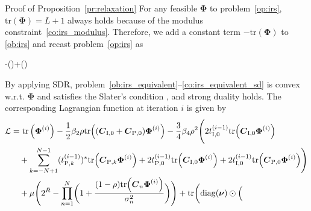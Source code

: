 \documentclass[journal,12pt,onecolumn,draftclsnofoot]{IEEEtran}
\begin{document}
	\begin{appendix}
		\begin{subsection}{Proof of Proposition~\ref{pr:relaxation}}\label{ap:relaxation}
			For any feasible $\boldsymbol{\Phi}$ to problem~\eqref{op:irs}, $\mathrm{tr}(\boldsymbol{\Phi})=L+1$ always holds because of the modulus constraint~\eqref{co:irs_modulus}. Therefore, we add a constant term $-\mathrm{tr}(\boldsymbol{\Phi})$ to \eqref{ob:irs} and recast problem~\eqref{op:irs} as
			\begin{maxi!}
				{\scriptstyle{\boldsymbol{\Phi}}}{-(\boldsymbol{\Phi})+(\boldsymbol{\Phi})}{\label{op:irs_equivalent}}{\label{ob:irs_equivalent}}
				\label{co:irs_equivalent_rate}
				\label{co:irs_equivalent_modulus}
				\label{co:irs_equivalent_sd}
			\end{maxi!}
			By applying SDR, problem~\eqref{ob:irs_equivalent}--\eqref{co:irs_equivalent_sd} is convex w.r.t. $\boldsymbol{\Phi}$ and satisfies the Slater's condition \cite{Boyd2004}, and strong duality holds. The corresponding Lagrangian function at iteration $i$ is given by
			\begin{align}\label{eq:lagrangian}
				\mathcal{L}
				& = \mathrm{tr}\left(\boldsymbol{\Phi}^{(i)}\right) - \frac{1}{2} \beta_2 \rho \mathrm{tr}\Bigl(
						(\boldsymbol{C}_{\mathrm{I},0} + \boldsymbol{C}_{\mathrm{P},0}) \boldsymbol{\Phi}^{(i)}
					\Bigr) - \frac{3}{4} \beta_4 \rho^2 \Biggl(
						2 t_{\mathrm{I},0}^{(i-1)} \mathrm{tr}\Bigl(
							\boldsymbol{C}_{\mathrm{I},0} \boldsymbol{\Phi}^{(i)}
						\Bigr)\nonumber\\
				& \quad + \sum_{k=-N+1}^{N-1} (t_{\mathrm{P},k}^{(i-1)})^* \mathrm{tr}\Bigl(
							\boldsymbol{C}_{\mathrm{P},k} \boldsymbol{\Phi}^{(i)}
						\Bigr) + 2 t_{\mathrm{P},0}^{(i-1)} \mathrm{tr}\Bigl(
						\boldsymbol{C}_{\mathrm{I},0} \boldsymbol{\Phi}^{(i)}
					\Bigr) + 2 t_{\mathrm{I},0}^{(i-1)} \mathrm{tr}\Bigl(
						\boldsymbol{C}_{\mathrm{P},0} \boldsymbol{\Phi}^{(i)}
					\Bigr)
					\Biggr)\nonumber\\
				& \quad + \mu \Biggl(
					2^{\bar{R}} - \prod_{n=1}^N \biggl(
						1 + \frac{(1-\rho) \mathrm{tr}\Bigl(
							\boldsymbol{C}_n \boldsymbol{\Phi}^{(i)}
						\Bigr)}{\sigma_n^2}
					\biggr)
				\Biggr) + \mathrm{tr}\biggl(
					\mathrm{diag}(\boldsymbol{\nu}) \odot \Bigl(

\end{align}
\end{subsection}
\end{appendix}
\end{document}
